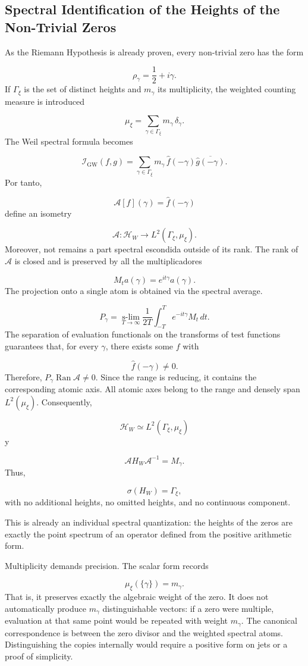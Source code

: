 \subsection{Spectral Identification of the Heights of the Non-Trivial Zeros}
As the Riemann Hypothesis is already proven, every non-trivial zero has the form\par
\[
\rho_\gamma=\frac12+i\gamma.
\]
If \(\Gamma_\xi\) is the set of distinct heights and \(m_\gamma\) its multiplicity, the weighted counting measure is introduced\par
\[
\mu_\xi
=
\sum_{\gamma\in\Gamma_\xi}
m_\gamma\,\delta_\gamma.
\]
The Weil spectral formula becomes\par
\[
\mathscr I_{\mathrm{GW}}(f,g)
=
\sum_{\gamma\in\Gamma_\xi}
m_\gamma\,
\widehat f(-\gamma)
\overline{\widehat g(-\gamma)}.
\]
Por tanto,\par
\[
\mathcal A[f](\gamma)
=
\widehat f(-\gamma)
\]
define an isometry\par
\[
\mathcal A:
\mathcal H_W
\longrightarrow
L^2(\Gamma_\xi,\mu_\xi).
\]
Moreover, not remains a part spectral escondida outside of its rank. The rank of \(\mathcal A\) is closed and is preserved by all the multiplicadores\par
\[
M_t a(\gamma)=e^{it\gamma}a(\gamma).
\]
The projection onto a single atom is obtained via the spectral average.\par
\[
P_\gamma
=
\operatorname*{s-lim}_{T\to\infty}
\frac1{2T}
\int_{-T}^{T}
e^{-it\gamma}M_t\,dt.
\]
The separation of evaluation functionals on the transforms of test functions guarantees that, for every \(\gamma\), there exists some \(f\) with\par
\[
\widehat f(-\gamma)\neq0.
\]
Therefore, \(P_\gamma\operatorname{Ran}\mathcal A\neq0\). Since the range is reducing, it contains the corresponding atomic axis. All atomic axes belong to the range and densely span \(L^2(\mu_\xi)\). Consequently,\par
\[
\boxed{
\mathcal H_W
\simeq
L^2(\Gamma_\xi,\mu_\xi)
}
\]
y\par
\[
\boxed{
\mathcal A H_W\mathcal A^{-1}
=
M_\gamma.
}
\]
Thus,\par
\[
\boxed{
\sigma(H_W)=\Gamma_\xi,
}
\]
with no additional heights, no omitted heights, and no continuous component.\par
This is already an individual spectral quantization: the heights of the zeros are exactly the point spectrum of an operator defined from the positive arithmetic form.\par
Multiplicity demands precision. The scalar form records\par
\[
\mu_\xi(\{\gamma\})=m_\gamma.
\]
That is, it preserves exactly the algebraic weight of the zero. It does not automatically produce \(m_\gamma\) distinguishable vectors: if a zero were multiple, evaluation at that same point would be repeated with weight \(m_\gamma\). The canonical correspondence is between the zero divisor and the weighted spectral atoms. Distinguishing the copies internally would require a positive form on jets or a proof of simplicity.\par
{}
